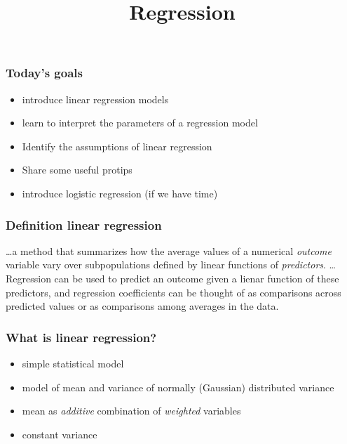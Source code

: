 \documentclass{beamer}
\title{Regression}
\date{}
\begin{document}
\begin{frame}
  \maketitle
\end{frame}


\begin{frame}
  \frametitle{Today's goals}

  \begin{itemize}
    \item introduce linear regression models
    \item learn to interpret the parameters of a regression model
    \item Identify the assumptions of linear regression
    \item Share some useful protips
    \item introduce logistic regression (if we have time)
  \end{itemize}
\end{frame}


\begin{frame}
  \frametitle{Definition linear regression}

  \begin{Large}
    \dots a method that summarizes how the average values of a numerical \textit{outcome} variable vary over subpopulations defined by linear functions of \textit{predictors}. \dots Regression can be used to predict an outcome given a lienar function of these predictors, and regression coefficients can be thought of as comparisons across predicted values or as comparisons among averages in the data.
  \end{Large}

\end{frame}


\begin{frame}
  \frametitle{What is linear regression?}

  \begin{itemize}
    \item simple statistical model
    \item model of mean and variance of normally (Gaussian) distributed variance
    \item mean as \textit{additive} combination of \textit{weighted} variables
    \item constant variance
  \end{itemize}
\end{frame}
\end{document}
